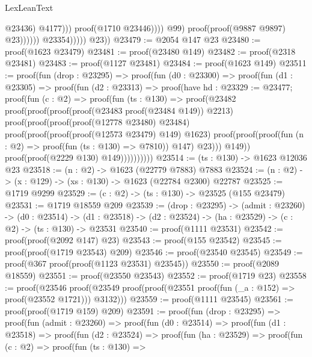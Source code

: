 \begin{lexlean}{LexLeanText}
\begin{coremodule}
                                                        @23436)
                                                      @4177)))
                                            proof(@1710 @23446))))
                                  @99)
                                proof(proof(@9887 @9897) @23))))))
                    @23354)))))
        @23))
@23479 := @2054 @147 @23
@23480 := proof(@1623 @23479)
@23481 := proof(@23480 @149)
@23482 := proof(@2318 @23481)
@23483 := proof(@1127 @23481)
@23484 := proof(@1623 @149)
@23511 := proof(fun (drop : @23295) =>
    proof(fun (d0 : @23300) =>
      proof(fun (d1 : @23305) =>
        proof(fun (d2 : @23313) =>
          proof(have hd : @23329 := @23477;
            proof(fun (c : @2) =>
              proof(fun (ts : @130) =>
                proof(@23482
                    proof(proof(proof(proof(@23483 proof(@23484 @149)) @2213)
                          proof(proof(proof(proof(@12778 @23480) @23484)
                                proof(proof(proof(proof(@12573 @23479) @149) @1623)
                                    proof(proof(proof(fun (n : @2) =>
                                          proof(fun (ts : @130) => @7810))
                                          @147)
                                        @23)))
                              @149))
                        proof(proof(@2229 @130) @149))))))))))
@23514 := (ts : @130) -> @1623 @12036 @23
@23518 := (n : @2) -> @1623 (@22779 @7883) @7883
@23524 := (n : @2) -> (x : @129) -> (xs : @130) -> @1623 (@22784 @2300) @22787
@23525 := @1719 @9299
@23529 := (c : @2) -> (ts : @130) -> @23525 (@155 @23479)
@23531 := @1719 @18559 @209
@23539 := (drop : @23295) ->
  (admit : @23260) ->
  (d0 : @23514) ->
  (d1 : @23518) -> (d2 : @23524) -> (ha : @23529) -> (c : @2) -> (ts : @130) -> @23531
@23540 := proof(@1111 @23531)
@23542 := proof(proof(@2092 @147) @23)
@23543 := proof(@155 @23542)
@23545 := proof(proof(@1719 @23543) @209)
@23546 := proof(@23540 @23545)
@23549 := proof(@367 proof(proof(@1123 @23531) @23545))
@23550 := proof(@2089 @18559)
@23551 := proof(@23550 @23543)
@23552 := proof(@1719 @23)
@23558 := proof(@23546
      proof(@23549 proof(proof(@23551 proof(fun (_a : @152) => proof(@23552 @1721))) @3132)))
@23559 := proof(@1111 @23545)
@23561 := proof(proof(@1719 @159) @209)
@23591 := proof(fun (drop : @23295) =>
    proof(fun (admit : @23260) =>
      proof(fun (d0 : @23514) =>
        proof(fun (d1 : @23518) =>
          proof(fun (d2 : @23524) =>
            proof(fun (ha : @23529) =>
              proof(fun (c : @2) =>
                proof(fun (ts : @130) =>

\end{coremodule}
\end{lexlean}
